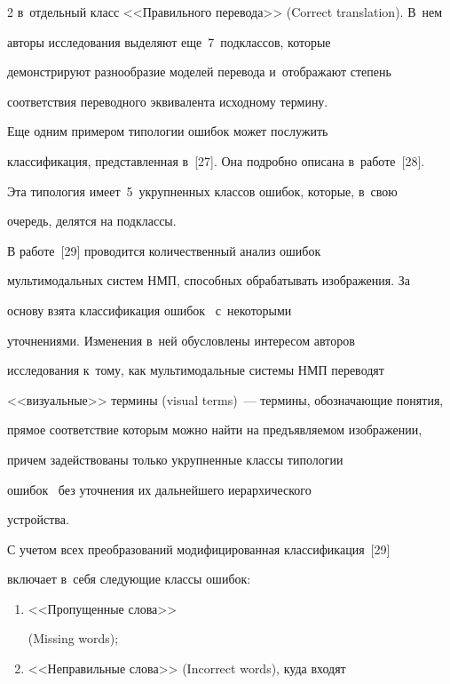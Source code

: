 \begin{multicols}{2}
в~отдельный класс <<Правильного перевода>> (Correct translation). В~нем 


авторы исследования выделяют еще~7~подклассов, которые 


демонстрируют разнообразие моделей перевода и~отображают степень 


соответствия переводного эквивалента исходному термину.


  


  Еще одним примером типологии ошибок может послужить 


классификация, представленная в~[27]. Она подробно описана в~работе~[28]. 


Эта типология имеет~5~укрупненных классов ошибок, которые, в~свою 


очередь, делятся на подклассы.


  


  В работе~[29] проводится количественный анализ ошибок 


мультимодальных систем НМП, способных обрабатывать изображения. За 


основу взята классификация ошибок~\cite{27-nur} с~некоторыми 


уточнениями. Изменения в~ней обусловлены интересом авторов 


исследования к~тому, как мультимодальные системы НМП переводят 


<<визуальные>> термины (visual terms)~--- термины, обозначающие понятия, 


прямое соответствие которым можно найти на предъявляемом изображении, 


причем задействованы только укрупненные классы типологии 


ошибок~\cite{27-nur} без уточнения их дальнейшего иерархического 


устройства.


  


  С учетом всех преобразований модифицированная классификация~[29] 


включает в~себя следующие классы ошибок: 


\begin{enumerate}[(1)]


\item <<Пропущенные слова>> 


(Missing words); 


\item <<Неправильные слова>> (Incorrect words), куда входят 



\end{enumerate}
\end{multicols}
